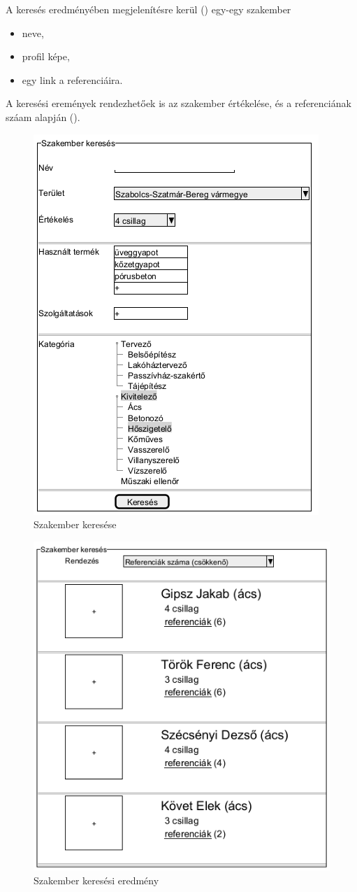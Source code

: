 A keresés eredményében megjelenítésre kerül () egy-egy szakember
\begin{itemize}
     \item neve,
     \item profil képe,
     \item egy link a referenciáira.
\end{itemize}
A keresési eremények rendezhetőek is az szakember értékelése, és a referenciának száam alapján ().

\begin{figure}[h]
	\centering
	\includegraphics[scale=0.5]{img/szakember_keres.png}
	\caption*{Szakember keresése}
	\label{fig:szak_ker}
\end{figure}

\begin{figure}[h]
	\centering
	\includegraphics[scale=0.5]{img/szakember_eredmeny.png}
	\caption*{Szakember keresési eredmény}
	\label{fig:szak_ker_ered}
\end{figure}